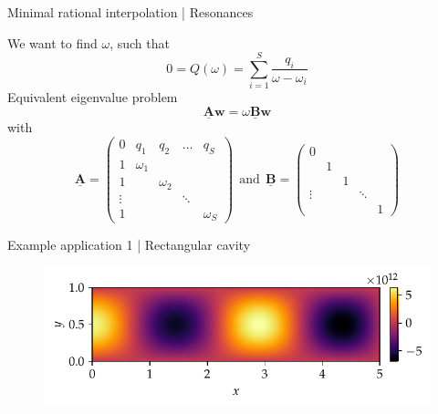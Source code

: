 \documentclass{beamer}
\begin{document}
\begin{frame}{Minimal rational interpolation | Resonances}

    We want to find $\omega$, such that
    \begin{equation*}
        0 = Q(\omega) = \sum_{i=1}^S \frac{q_i}{\omega - \omega_i}
    \end{equation*}
    Equivalent eigenvalue problem
    \begin{equation*}
        \mathbf{\underline{A}} \mathbf{w} = \omega \mathbf{\underline{B}} \mathbf{w}
    \end{equation*}
    with
    \begin{equation*}
        \mathbf{\underline{A}} = \begin{pmatrix}
            0 & q_1 & q_2 & \dots & q_S \\
            1 & \omega_1 & & & \\
            1 & & \omega_2 & & \\
            \vdots & & & \ddots & \\
            1 & & & & \omega_S
        \end{pmatrix} ~~\text{and}~~
        \mathbf{\underline{B}} = \begin{pmatrix}
            0 & & & & \\
            & 1 & & & \\
            & & 1 & & \\ 
            \vdots & & & \ddots & \\ 
            & & & & 1
        \end{pmatrix}
    \end{equation*}

\end{frame}

\begin{frame}{Example application 1 | Rectangular cavity}

    \begin{figure}
        \centering
        \scalebox{0.9}{}
    \end{figure}
    \vspace{-45pt}
    \begin{figure}
        \centering
        \includegraphics[scale=0.9]{../report/plots/rectangular_cavity_mode1.pdf}
    \end{figure}

\end{frame}
\end{document}

